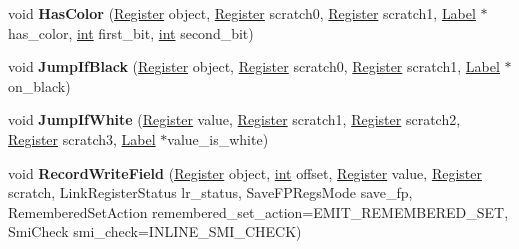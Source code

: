 \begin{DoxyCompactItemize}
\item 
\mbox{\label{classv8_1_1internal_1_1MacroAssembler_af2ca9bcdecb35e016e8f7806bf7e0161}} 
void {\bfseries Has\+Color} (\mbox{\hyperlink{classv8_1_1internal_1_1Register}{Register}} object, \mbox{\hyperlink{classv8_1_1internal_1_1Register}{Register}} scratch0, \mbox{\hyperlink{classv8_1_1internal_1_1Register}{Register}} scratch1, \mbox{\hyperlink{classv8_1_1internal_1_1Label}{Label}} $\ast$has\+\_\+color, \mbox{\hyperlink{classint}{int}} first\+\_\+bit, \mbox{\hyperlink{classint}{int}} second\+\_\+bit)
\item 
\mbox{\label{classv8_1_1internal_1_1MacroAssembler_afa6130b855c3a0cba5e359c3b0abc45d}} 
void {\bfseries Jump\+If\+Black} (\mbox{\hyperlink{classv8_1_1internal_1_1Register}{Register}} object, \mbox{\hyperlink{classv8_1_1internal_1_1Register}{Register}} scratch0, \mbox{\hyperlink{classv8_1_1internal_1_1Register}{Register}} scratch1, \mbox{\hyperlink{classv8_1_1internal_1_1Label}{Label}} $\ast$on\+\_\+black)
\item 
\mbox{\label{classv8_1_1internal_1_1MacroAssembler_a391a92e786e96f89deebed6b210512fc}} 
void {\bfseries Jump\+If\+White} (\mbox{\hyperlink{classv8_1_1internal_1_1Register}{Register}} value, \mbox{\hyperlink{classv8_1_1internal_1_1Register}{Register}} scratch1, \mbox{\hyperlink{classv8_1_1internal_1_1Register}{Register}} scratch2, \mbox{\hyperlink{classv8_1_1internal_1_1Register}{Register}} scratch3, \mbox{\hyperlink{classv8_1_1internal_1_1Label}{Label}} $\ast$value\+\_\+is\+\_\+white)
\item 
\mbox{\label{classv8_1_1internal_1_1MacroAssembler_a612d90391b176f5d40e0349ed4a82439}} 
void {\bfseries Record\+Write\+Field} (\mbox{\hyperlink{classv8_1_1internal_1_1Register}{Register}} object, \mbox{\hyperlink{classint}{int}} offset, \mbox{\hyperlink{classv8_1_1internal_1_1Register}{Register}} value, \mbox{\hyperlink{classv8_1_1internal_1_1Register}{Register}} scratch, Link\+Register\+Status lr\+\_\+status, Save\+F\+P\+Regs\+Mode save\+\_\+fp, Remembered\+Set\+Action remembered\+\_\+set\+\_\+action=E\+M\+I\+T\+\_\+\+R\+E\+M\+E\+M\+B\+E\+R\+E\+D\+\_\+\+S\+ET, Smi\+Check smi\+\_\+check=I\+N\+L\+I\+N\+E\+\_\+\+S\+M\+I\+\_\+\+C\+H\+E\+CK)
\item 

\end{DoxyCompactItemize}
